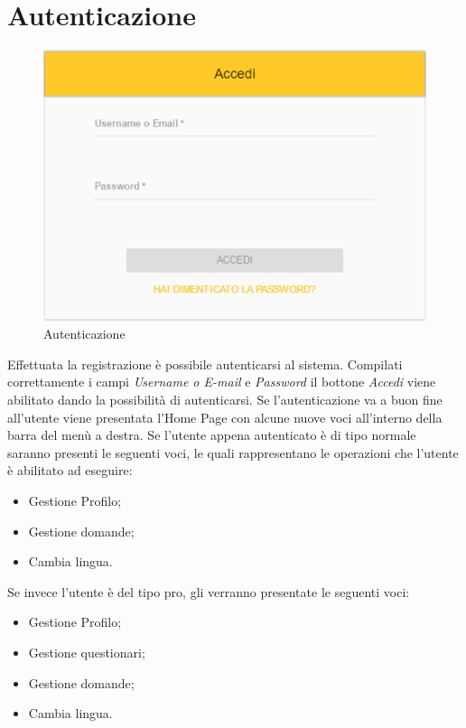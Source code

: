 \newpage
\section{Autenticazione}

\label{Autenticazione}
\begin{figure}[ht]
	\centering
	\includegraphics[scale=0.65]{img/autenticazione.png}
	\caption{Autenticazione}
\end{figure}
\FloatBarrier

Effettuata la registrazione è possibile autenticarsi al sistema. Compilati correttamente i campi \textit{Username o E-mail} e \textit{Password} il bottone \textit{Accedi} viene abilitato dando la possibilità di autenticarsi. Se l'autenticazione va a buon fine all'utente viene presentata l'Home Page con alcune nuove voci all'interno della barra del menù a destra. Se l'utente appena autenticato è di tipo normale saranno presenti le seguenti voci, le quali rappresentano le operazioni che l'utente è abilitato ad eseguire:
\begin{itemize}
	\item Gestione Profilo;
	\item Gestione domande;
	\item Cambia lingua.
\end{itemize}
Se invece l'utente è del tipo pro, gli verranno presentate le seguenti voci:
\begin{itemize}
	\item Gestione Profilo;
	\item Gestione questionari;
	\item Gestione domande;
	\item Cambia lingua. 
\end{itemize}